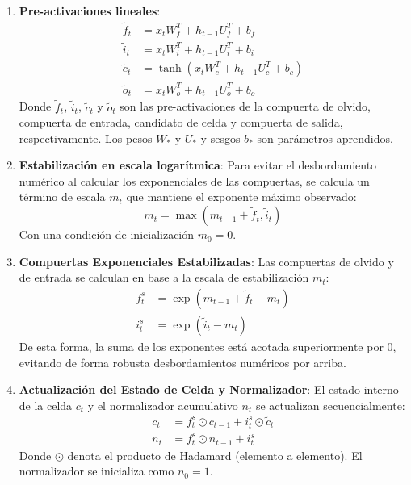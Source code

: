 \documentclass[12pt, a4paper]{article}
\begin{document}
\begin{enumerate}
    \item \textbf{Pre-activaciones lineales}:
    \begin{align}
        \tilde{f}_t &= x_t W_f^T + h_{t-1} U_f^T + b_f \\
        \tilde{i}_t &= x_t W_i^T + h_{t-1} U_i^T + b_i \\
        \tilde{c}_t &= \tanh(x_t W_c^T + h_{t-1} U_c^T + b_c) \\
        \tilde{o}_t &= x_t W_o^T + h_{t-1} U_o^T + b_o
    \end{align}
    Donde $\tilde{f}_t$, $\tilde{i}_t$, $\tilde{c}_t$ y $\tilde{o}_t$ son las pre-activaciones de la compuerta de olvido, compuerta de entrada, candidato de celda y compuerta de salida, respectivamente. Los pesos $W_*$ y $U_*$ y sesgos $b_*$ son parámetros aprendidos.

    \item \textbf{Estabilización en escala logarítmica}:
    Para evitar el desbordamiento numérico al calcular los exponenciales de las compuertas, se calcula un término de escala $m_t$ que mantiene el exponente máximo observado:
    \begin{equation}
        m_t = \max(m_{t-1} + \tilde{f}_t, \tilde{i}_t)
    \end{equation}
    Con una condición de inicialización $m_0 = 0$.

    \item \textbf{Compuertas Exponenciales Estabilizadas}:
    Las compuertas de olvido y de entrada se calculan en base a la escala de estabilización $m_t$:
    \begin{align}
        f_t^s &= \exp(m_{t-1} + \tilde{f}_t - m_t) \\
        i_t^s &= \exp(\tilde{i}_t - m_t)
    \end{align}
    De esta forma, la suma de los exponentes está acotada superiormente por $0$, evitando de forma robusta desbordamientos numéricos por arriba.

    \item \textbf{Actualización del Estado de Celda y Normalizador}:
    El estado interno de la celda $c_t$ y el normalizador acumulativo $n_t$ se actualizan secuencialmente:
    \begin{align}
        c_t &= f_t^s \odot c_{t-1} + i_t^s \odot \tilde{c}_t \\
        n_t &= f_t^s \odot n_{t-1} + i_t^s
    \end{align}
    Donde $\odot$ denota el producto de Hadamard (elemento a elemento). El normalizador se inicializa como $n_0 = 1$.


\end{enumerate}
\end{document}
